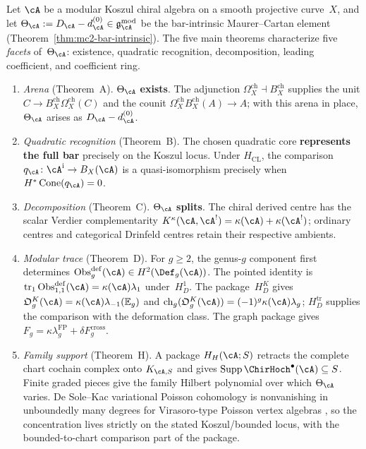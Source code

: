 \begin{principle}
\label{princ:five-facets}
%
Let\/ $\cA$ be a modular Koszul chiral algebra on a smooth projective
curve~$X$, and let\/ $\Theta_\cA := D_\cA - d_\cA^{(0)} \in \gAmod$
be the bar-intrinsic Maurer--Cartan element
\textup{(}Theorem~\textup{\ref{thm:mc2-bar-intrinsic}}\textup{)}.
The five main theorems characterize five
\emph{facets} of~$\Theta_\cA$: existence, quadratic recognition,
decomposition, leading coefficient, and coefficient ring.
\begin{enumerate}[label=\textup{(\Alph*)}]
\item \emph{Arena}
 \textup{(}Theorem~A\textup{)}.
 $\Theta_\cA$ \textbf{exists}.
 The adjunction $\Omega_X^{\mathrm{ch}}\dashv B_X^{\mathrm{ch}}$
 supplies the unit
 $C\to B_X^{\mathrm{ch}}\Omega_X^{\mathrm{ch}}(C)$ and the counit
 $\Omega_X^{\mathrm{ch}}B_X^{\mathrm{ch}}(A)\to A$; with this arena
 in place, $\Theta_\cA$ arises as $D_\cA-d_\cA^{(0)}$.

\item \emph{Quadratic recognition}
 \textup{(}Theorem~B\textup{)}.
 The chosen quadratic core \textbf{represents the full bar} precisely
 on the Koszul locus. Under $H_{\mathrm{CL}}$, the comparison
 $q_\cA\colon\cA^{\mathrm i}\to B_X(\cA)$ is a quasi-isomorphism
 precisely when $H^*\operatorname{Cone}(q_\cA)=0$.

\item \emph{Decomposition}
 \textup{(}Theorem~C\textup{)}.
 $\Theta_\cA$ \textbf{splits}.
 The chiral derived centre has the scalar Verdier complementarity
 $K^\kappa(\cA,\cA^!)=\kappa(\cA)+\kappa(\cA^!)$; ordinary centres
 and categorical Drinfeld centres retain their respective ambients.

\item \emph{Modular trace}
 \textup{(}Theorem~D\textup{)}.
 For $g\geq2$, the genus-$g$ component first determines
 $\operatorname{Obs}^{\mathrm{def}}_g(\cA)\in H^2(\Def_g(\cA))$.
 The pointed identity is
 $\operatorname{tr}_1\operatorname{Obs}^{\mathrm{def}}_{1,1}(\cA)
 =\kappa(\cA)\lambda_1$ under~$H_D^1$.
 The package~$H_D^K$ gives
 $\mathfrak O_g^K(\cA)=\kappa(\cA)\lambda_{-1}(\mathbb E_g)$ and
 $\operatorname{ch}_g(\mathfrak O_g^K(\cA))=
 (-1)^g\kappa(\cA)\lambda_g$; $H_D^{\mathrm{tr}}$ supplies the
 comparison with the deformation class.  The graph package gives
 $F_g=\kappa\lambda_g^{\mathrm{FP}}+\delta F_g^{\mathrm{cross}}$.

\item \emph{Family support}
 \textup{(}Theorem~H\textup{)}.
 A package $H_H(\cA;S)$ retracts the complete chart cochain complex
 onto $K_{\cA,S}$ and gives
 $\operatorname{Supp}\ChirHoch^\bullet(\cA)\subseteq S$.  Finite
 graded pieces give the family Hilbert polynomial over which
 $\Theta_\cA$ varies.  De Sole--Kac variational Poisson cohomology
 is nonvanishing in unboundedly many degrees for Virasoro-type
 Poisson vertex algebras \cite{BDSK21}, so the concentration lives
 strictly on the stated Koszul/bounded locus, with the
 bounded-to-chart comparison part of the package.
\end{enumerate}
\end{principle}

